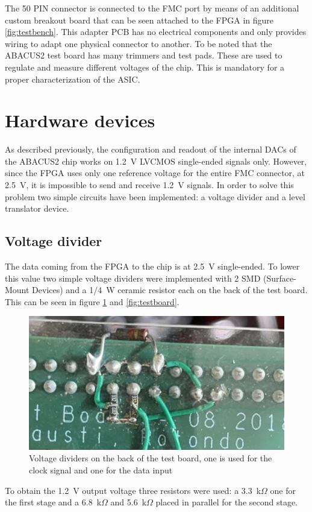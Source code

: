 \noindent The 50 PIN connector is connected to the FMC port by means of an additional custom breakout board that can be seen attached to the FPGA in figure \ref{fig:testbench}. This adapter PCB has no electrical components and only provides wiring to adapt one physical connector to another.
To be noted that the ABACUS2 test board has many trimmers and test pads. These are used to regulate and measure different voltages of the chip. This is mandatory for a proper characterization of the ASIC.
\section{Hardware devices}\label{hardware}
\noindent As described previously, the configuration and readout of the internal DACs of the ABACUS2 chip works on 1.2~V LVCMOS single-ended signals only. However, since the FPGA uses only one reference voltage for the entire FMC connector, at 2.5~V, it is impossible to send and receive 1.2~V signals.
In order to solve this problem two simple circuits have been implemented: a voltage divider and a level translator device.
\subsection{Voltage divider}
The data coming from the FPGA to the chip is at 2.5~V single-ended. To lower this value two simple voltage dividers were implemented with 2 SMD (Surface-Mount Devices) and a 1/4~W ceramic resistor each on the back of the test board. This can be seen in figure \ref{fig:voltagedivider} and \ref{fig:testboard}.
\begin{figure}[H]
	\centering
	\includegraphics[width=0.6\linewidth]{IMG/ch5/VOLTAGEDIVIDER}
	\caption{Voltage dividers on the back of the test board, one is used for the clock signal and one for the data input}
	\label{fig:voltagedivider}
\end{figure}
\noindent To obtain the 1.2~V output voltage three resistors were used: a 3.3~k$\Omega$ one for the first stage and a 6.8~k$\Omega$ and 5.6~k$\Omega$ placed in parallel for the second stage.
